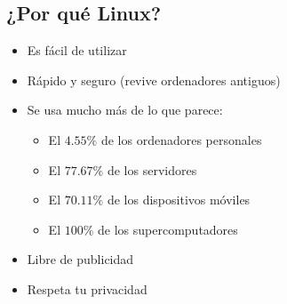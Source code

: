 \documentclass[aspectratio=43]{beamer}
\begin{document}
    \subsection{¿Por qué Linux?}
     \begin{frame}{\subsecname}{}
        \begin{itemize}
            \item Es fácil de utilizar
            \item Rápido y seguro (revive ordenadores antiguos)
            \item Se usa mucho más de lo que parece:
            \begin{itemize}
                \item El $4.55\%$ de los ordenadores personales
                \item El $77.67\%$ de los servidores
                \item El $70.11\%$ de los dispositivos móviles
                \item El $100\%$ de los supercomputadores
            \end{itemize}
            \item Libre de publicidad
            \item Respeta tu privacidad
        \end{itemize}
    \end{frame}

\end{document}

